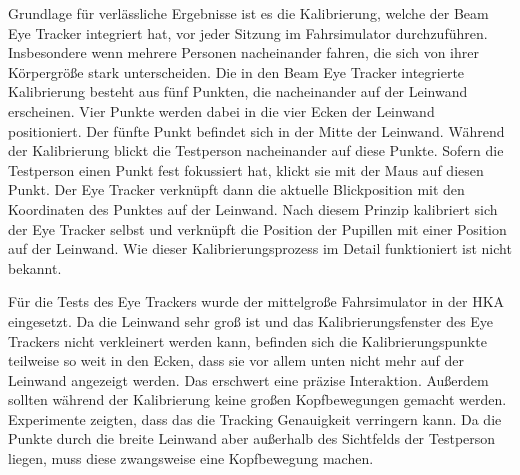 Grundlage für verlässliche Ergebnisse ist es die Kalibrierung, welche der Beam Eye Tracker integriert hat, vor jeder Sitzung im Fahrsimulator durchzuführen. Insbesondere wenn mehrere Personen nacheinander fahren, die sich von ihrer Körpergröße stark unterscheiden. Die in den Beam Eye Tracker integrierte Kalibrierung besteht aus fünf Punkten, die nacheinander auf der Leinwand erscheinen. Vier Punkte werden dabei in die vier Ecken der Leinwand positioniert. Der fünfte Punkt befindet sich in der Mitte der Leinwand. Während der Kalibrierung blickt die Testperson nacheinander auf diese Punkte. Sofern die Testperson einen Punkt fest fokussiert hat, klickt sie mit der Maus auf diesen Punkt. Der Eye Tracker verknüpft dann die aktuelle Blickposition mit den Koordinaten des Punktes auf der Leinwand. Nach diesem Prinzip kalibriert sich der Eye Tracker selbst und verknüpft die Position der Pupillen mit einer Position auf der Leinwand. Wie dieser Kalibrierungsprozess im Detail funktioniert ist nicht bekannt.

Für die Tests des Eye Trackers wurde der mittelgroße Fahrsimulator in der {\ac{HKA}} eingesetzt. Da die Leinwand sehr groß ist und das Kalibrierungsfenster des Eye Trackers nicht verkleinert werden kann, befinden sich die Kalibrierungspunkte teilweise so weit in den Ecken, dass sie vor allem unten nicht mehr auf der Leinwand angezeigt werden. Das erschwert eine präzise Interaktion. Außerdem sollten während der Kalibrierung keine großen Kopfbewegungen gemacht werden. Experimente zeigten, dass das die Tracking Genauigkeit verringern kann. Da die Punkte durch die breite Leinwand aber außerhalb des Sichtfelds der Testperson liegen, muss diese zwangsweise eine Kopfbewegung machen. 

